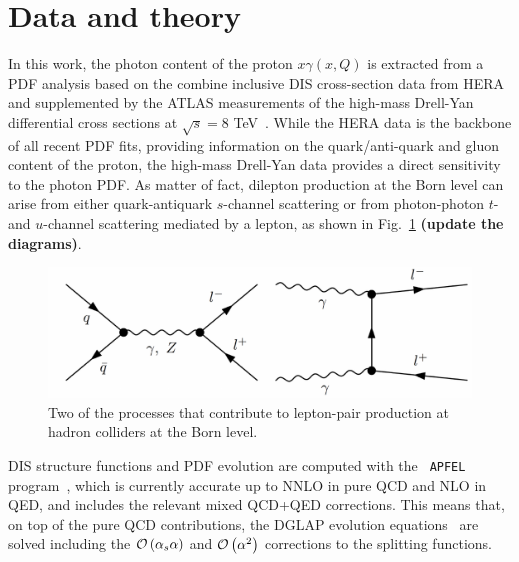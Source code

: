 \section{Data and theory}
\label{sec:theory}

In this work, the photon content of the proton $x\gamma(x,Q)$ is
extracted from a PDF analysis based on the combine inclusive DIS
cross-section data from HERA~\cite{Abramowicz:2015mha} and
supplemented by the ATLAS measurements of the high-mass Drell-Yan
differential cross sections at $\sqrt{s}=8$ TeV~\cite{Aad:2016zzw}.
%
While the HERA data is the backbone of all recent PDF fits, providing
information on the quark/anti-quark and gluon content of the proton,
the high-mass Drell-Yan data provides a direct sensitivity to the
photon PDF.
%
As matter of fact, dilepton production at the Born level can arise
from either quark-antiquark $s$-channel scattering or from
photon-photon $t$- and $u$-channel scattering mediated by a lepton, as
shown in Fig.~\ref{fig:photoninduced} \textbf{(update the diagrams)}.

\begin{figure}[t]
  \begin{center}
    \includegraphics[width=15cm]{figs/photoninduced.pdf}
    \end{center}
    \caption{Two of the processes that contribute to lepton-pair
      production at hadron colliders at the Born level.}
\label{fig:photoninduced}
\end{figure}

DIS structure functions and PDF evolution are computed with the {\tt
  APFEL} program~\cite{Bertone:2013vaa}, which is currently accurate
up to NNLO in pure QCD and NLO in QED, and includes the relevant mixed
QCD+QED corrections. This means that, on top of the pure QCD
contributions, the DGLAP evolution
equations~\cite{Gribov:1972ri,Dokshitzer:1977,Altarelli:1977zs} are
solved including the $\mathcal{O}\left( \alpha_s\alpha\right)$ and
$\mathcal{O}\left( \alpha^2\right)$ corrections to the splitting functions.

